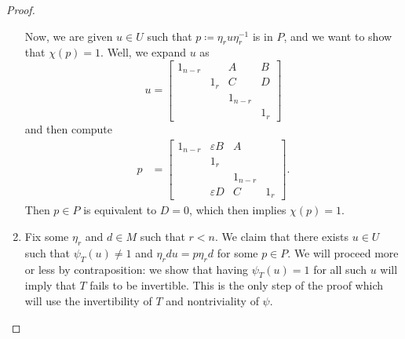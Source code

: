 \begin{proof}
\begin{enumerate}
		Now, we are given $u\in U$ such that $p\coloneqq\eta_ru\eta_r^{-1}$ is in $P$, and we want to show that $\chi(p)=1$. Well, we expand $u$ as
        \[u=\begin{bmatrix}
            1_{n-r} && A & B \\ & 1_r & C & D \\
				&& 1_{n-r} \\ &&& 1_r
        \end{bmatrix}\]
        and then compute
		\begin{align*}
			p &= \begin{bmatrix}
				1_{n-r} & \varepsilon B & A \\ & 1_r \\
				&& 1_{n-r} \\ & \varepsilon D & C & 1_r
			\end{bmatrix}.
		\end{align*}
		Then $p\in P$ is equivalent to $D=0$, which then implies $\chi(p)=1$.

		\item Fix some $\eta_r$ and $d\in M$ such that $r<n$. We claim that there exists $u\in U$ such that $\psi_T(u)\ne1$ and $\eta_rdu=p\eta_rd$ for some $p\in P$. We will proceed more or less by contraposition: we show that having $\psi_T(u)=1$ for all such $u$ will imply that $T$ fails to be invertible. This is the only step of the proof which will use the invertibility of $T$ and nontriviality of $\psi$.


\end{enumerate}
\end{proof}
